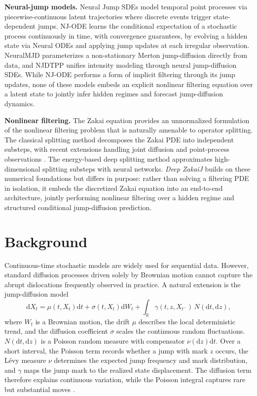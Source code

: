 \documentclass{article}
\newcommand{\R}{\mathbb{R}}
\newcommand{\dd}{\mathrm{d}}
\begin{document}
\textbf{Neural-jump models.} Neural Jump SDEs \citep{jia2019neural} model temporal point processes via piecewise-continuous latent trajectories where discrete events trigger state-dependent jumps. NJ-ODE \citep{herrera2021neural} learns the conditional expectation of a stochastic process continuously in time, with convergence guarantees, by evolving a hidden state via Neural ODEs \citep{chen2018neural} and applying jump updates at each irregular observation. NeuralMJD \citep{gao2025neural} parameterizes a non-stationary Merton jump-diffusion directly from data, and NJDTPP \citep{zhang2024neural} unifies intensity modeling through neural jump-diffusion SDEs. While NJ-ODE performs a form of implicit filtering through its jump updates, none of these models embeds an explicit nonlinear filtering equation over a latent state to jointly infer hidden regimes and forecast jump-diffusion dynamics.

\textbf{Nonlinear filtering.} The Zakai equation \citep{zakai1969optimal} provides an unnormalized formulation of the nonlinear filtering problem that is naturally amenable to operator splitting. The classical splitting method \citep{bensoussan1990approximation,gobet2006discretization,derchu2020bayesian} decomposes the Zakai PDE into independent substeps, with recent extensions handling joint diffusion and point-process observations \citep{zhang2024splitting}. The energy-based deep splitting method \citep{baagmark2023energy} approximates high-dimensional splitting substeps with neural networks. \textit{Deep ZakaiJ} builds on these numerical foundations but differs in purpose: rather than solving a filtering PDE in isolation, it embeds the discretized Zakai equation into an end-to-end architecture, jointly performing nonlinear filtering over a hidden regime and structured conditional jump-diffusion prediction.


\section{Background}
\label{sec:background}
Continuous-time stochastic models are widely used for sequential data. However, standard diffusion processes driven solely by Brownian motion cannot capture the abrupt dislocations frequently observed in practice. A natural extension is the jump-diffusion model \citep{black1973pricing,kou2002jump}
\begin{equation*}
\dd X_t
=
\mu(t,X_t)\dd t
+
\sigma(t,X_t)\dd W_t
+
\int_{\R}\gamma(t,z,X_{t^-})\,N(\dd t,\dd z),
\end{equation*}
where $W_t$ is a Brownian motion, the drift $\mu$ describes the local deterministic trend, and the diffusion coefficient $\sigma$ scales the continuous random fluctuations. $N(\dd t,\dd z)$ is a Poisson random measure with compensator $\nu(\dd z)\dd t$. Over a short interval, the Poisson term records whether a jump with mark $z$ occurs, the L\'evy measure $\nu$ determines the expected jump frequency and mark distribution, and $\gamma$ maps the jump mark to the realized state displacement. The diffusion term therefore explains continuous variation, while the Poisson integral captures rare but substantial moves \citep{kou2002jump}.
\end{document}

